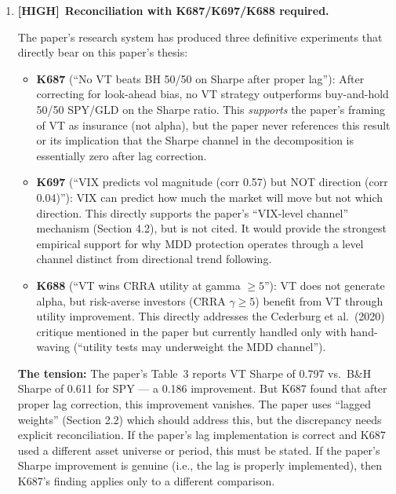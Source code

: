 \documentclass[12pt,a4paper]{article}
\newcommand{\HIGH}{\textcolor{highsev}{\textbf{[HIGH]}}}
\begin{document}
\begin{enumerate}[label=\textbf{A.\arabic*}]

\item \HIGH\ \textbf{Reconciliation with K687/K697/K688 required.}

The paper's research system has produced three definitive experiments that directly bear on this paper's thesis:

\begin{itemize}
\item \textbf{K687} (``No VT beats BH 50/50 on Sharpe after proper lag''):  After correcting for look-ahead bias, no VT strategy outperforms buy-and-hold 50/50 SPY/GLD on the Sharpe ratio. This \textit{supports} the paper's framing of VT as insurance (not alpha), but the paper never references this result or its implication that the Sharpe channel in the decomposition is essentially zero after lag correction.

\item \textbf{K697} (``VIX predicts vol magnitude (corr 0.57) but NOT direction (corr 0.04)''):  VIX can predict how much the market will move but not which direction. This directly supports the paper's ``VIX-level channel'' mechanism (Section 4.2), but is not cited. It would provide the strongest empirical support for why MDD protection operates through a level channel distinct from directional trend following.

\item \textbf{K688} (``VT wins CRRA utility at gamma $\geq 5$''): VT does not generate alpha, but risk-averse investors (CRRA $\gamma \geq 5$) benefit from VT through utility improvement. This directly addresses the Cederburg et al.\ (2020) critique mentioned in the paper but currently handled only with hand-waving (``utility tests may underweight the MDD channel'').
\end{itemize}

\textbf{The tension:} The paper's Table~3 reports VT Sharpe of 0.797 vs.\ B\&H Sharpe of 0.611 for SPY --- a 0.186 improvement. But K687 found that after proper lag correction, this improvement vanishes. The paper uses ``lagged weights'' (Section 2.2) which should address this, but the discrepancy needs explicit reconciliation. If the paper's lag implementation is correct and K687 used a different asset universe or period, this must be stated. If the paper's Sharpe improvement is genuine (i.e., the lag is properly implemented), then K687's finding applies only to a different comparison.


\end{enumerate}
\end{document}
